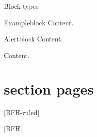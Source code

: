 \documentclass[
	ngerman,%
	]{bfhbeamer}
\begin{document}
\begin{frame}{Block types}
	\begin{exampleblock}{Exampleblock}
		Content.
	\end{exampleblock}
	\begin{alertblock}{Alertblock}
		Content.
	\end{alertblock}
	\begin{example}
		Content.
	\end{example}
\end{frame}

\section{section pages}

\frame{\sectionpage}

[BFH-ruled]

\frame{\sectionpage}




\frame{\sectionpage}

[BFH]

\frame{\sectionpage}

\frame[plain]{\sectionpage}
\end{document}
